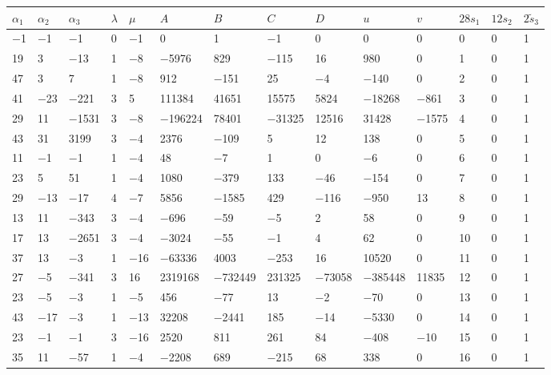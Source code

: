 \documentclass[pdftex]{sigma}
\numberwithin{equation}{section}
\theoremstyle{definition}
\numberwithin{table}{section}
\begin{document}
{\begin{paracol}{3}
		\begin{supertabular}{|w{c}{.32cm}w{c}{.32cm}w{c}{.32cm}@{\hspace{.5cm}}w{c}{.2cm}w{c}{.2cm}|@{\hspace{\tabcolsep}}HHHHHHw{c}{.17cm}w{c}{.17cm}w{c}{.17cm}|}
			\hline $\alpha_1$ & $\alpha_2$ & $\alpha_3$ & $\lambda$ & $\mu$ & $A$ & $B$ & $C$ & $D$ & $u$ & $v$ & $28s_1$ & $12s_2$ & $2\tilde{s}_3$ \\ \hline
			$-$1 & $-$1 & $-$1 & 0 & $-$1 & 0 & 1 & $-$1 & 0 & 0 & 0 & 0 & 0 & 1 \\
			19 & 3 & $-$13 & 1 & $-$8 & $-$5976 & 829 & $-$115 & 16 & 980 & 0 & 1 & 0 & 1 \\
			47 & 3 & 7 & 1 & $-$8 & 912 & $-$151 & 25 & $-$4 & $-$140 & 0 & 2 & 0 & 1 \\
			41 & $-$23 & $-$221 & 3 & 5 & 111384 & 41651 & 15575 & 5824 & $-$18268 & $-$861 & 3 & 0 & 1 \\
			29 & 11 & $-$1531 & 3 & $-$8 & $-$196224 & 78401 & $-$31325 & 12516 & 31428 & $-$1575 & 4 & 0 & 1 \\
			43 & 31 & 3199 & 3 & $-$4 & 2376 & $-$109 & 5 & 12 & 138 & 0 & 5 & 0 & 1 \\
			11 & $-$1 & $-$1 & 1 & $-$4 & 48 & $-$7 & 1 & 0 & $-$6 & 0 & 6 & 0 & 1 \\
			23 & 5 & 51 & 1 & $-$4 & 1080 & $-$379 & 133 & $-$46 & $-$154 & 0 & 7 & 0 & 1 \\
			29 & $-$13 & $-$17 & 4 & $-$7 & 5856 & $-$1585 & 429 & $-$116 & $-$950 & 13 & 8 & 0 & 1 \\
			13 & 11 & $-$343 & 3 & $-$4 & $-$696 & $-$59 & $-$5 & 2 & 58 & 0 & 9 & 0 & 1 \\
			17 & 13 & $-$2651 & 3 & $-$4 & $-$3024 & $-$55 & $-$1 & 4 & 62 & 0 & 10 & 0 & 1 \\
			37 & 13 & $-$3 & 1 & $-$16 & $-$63336 & 4003 & $-$253 & 16 & 10520 & 0 & 11 & 0 & 1 \\
			27 & $-$5 & $-$341 & 3 & 16 & 2319168 & $-$732449 & 231325 & $-$73058 & $-$385448 & 11835 & 12 & 0 & 1 \\
			23 & $-$5 & $-$3 & 1 & $-$5 & 456 & $-$77 & 13 & $-$2 & $-$70 & 0 & 13 & 0 & 1 \\
			43 & $-$17 & $-$3 & 1 & $-$13 & 32208 & $-$2441 & 185 & $-$14 & $-$5330 & 0 & 14 & 0 & 1 \\
			23 & $-$1 & $-$1 & 3 & $-$16 & 2520 & 811 & 261 & 84 & $-$408 & $-$10 & 15 & 0 & 1 \\
			35 & 11 & $-$57 & 1 & $-$4 & $-$2208 & 689 & $-$215 & 68 & 338 & 0 & 16 & 0 & 1 \\

\end{supertabular}
\end{paracol}}
\end{document}
